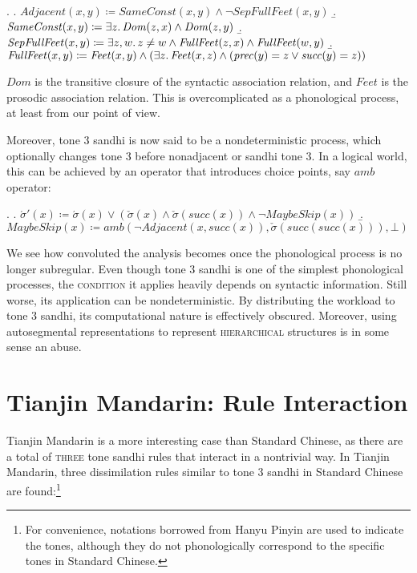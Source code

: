 \documentclass[12pt, a4paper]{report}
\newcommand{\textemph}[1]{\textsc{#1}}
\begin{document}
\ex.
\a. \(\mathit{Adjacent}(x, y) \coloneq \mathit{SameConst}(x, y) \land
\neg\mathit{SepFullFeet}(x, y)\)
\b. \(\mathit{SameConst}(x, y) \coloneq \exists z\ldotp
\mathit{Dom}(z, x) \land \mathit{Dom}(z, y)\)
\b. \(\mathit{SepFullFeet}(x, y) \coloneq \exists z, w\ldotp
z \neq w \land \mathit{FullFeet}(z, x) \land \mathit{FullFeet}(w, y)\)
\b. \(\mathit{FullFeet}(x, y) \coloneq \mathit{Feet}(x, y) \land
(\exists z\ldotp \mathit{Feet}(x, z) \land
(\mathit{prec}(y) = z \lor \mathit{succ}(y) = z))\)

\(\mathit{Dom}\) is the transitive closure of the syntactic
association relation, and \(\mathit{Feet}\) is the prosodic
association relation.  This is overcomplicated as a phonological
process, at least from our point of view.

Moreover, tone 3 sandhi is now said to be a nondeterministic process,
which optionally changes tone 3 before nonadjacent or sandhi tone 3.
In a logical world, this can be achieved by an operator that
introduces choice points, say  \(\mathit{amb}\)
operator:

\ex.
\a. \(\acute{\sigma}'(x) \coloneq \acute{\sigma}(x) \lor
(\check{\sigma}(x) \land \check{\sigma}(\mathit{succ}(x))
\land \neg\mathit{MaybeSkip}(x))\)
\b. \(\mathit{MaybeSkip}(x) \coloneq
\mathit{amb}(\neg\mathit{Adjacent}(x, \mathit{succ}(x)),
\check{\sigma}(\mathit{succ}(\mathit{succ}(x))), \bot)\)

We see how convoluted the analysis becomes once the phonological
process is no longer subregular.  Even though tone 3 sandhi is one of
the simplest phonological processes, the \textemph{condition} it
applies heavily depends on syntactic information.  Still worse, its
application can be nondeterministic.  By distributing the workload to
tone 3 sandhi, its computational nature is effectively obscured.
Moreover, using autosegmental representations to represent
\textemph{hierarchical} structures is in some sense an abuse.

\section{Tianjin Mandarin: Rule Interaction}
Tianjin Mandarin is a more interesting case than Standard Chinese, as
there are a total of \textemph{three} tone sandhi rules that interact
in a nontrivial way.  In Tianjin Mandarin, three dissimilation rules
similar to tone 3 sandhi in Standard Chinese are found:\footnote{For
  convenience, notations borrowed from Hanyu Pinyin are used to
  indicate the tones, although they do not phonologically correspond
  to the specific tones in Standard Chinese.}
\end{document}
